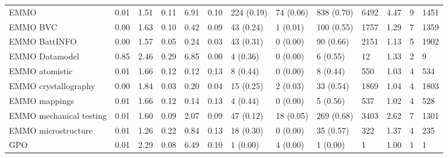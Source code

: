 \begin{table}
\begin{tabular}{m{3.5cm}m{2cm}m{2cm}m{2cm}m{2cm}m{2cm}m{2cm}m{2cm}m{2cm}m{2cm}m{2cm}m{2cm}m{2cm}}
EMMO                    &                0.01 &                  1.51 &                   0.11 &               6.91 &               0.10 &  224 (0.19) &   74 (0.06) &   838 (0.70) &            6492 &     4.47 &          9 &              1451 \\
EMMO BVC                &                0.00 &                  1.63 &                   0.10 &               0.42 &               0.09 &   43 (0.24) &    1 (0.01) &   100 (0.55) &            1757 &     1.29 &          7 &              1359 \\
EMMO BattINFO           &                0.00 &                  1.57 &                   0.05 &               0.24 &               0.03 &   43 (0.31) &    0 (0.00) &    90 (0.66) &            2151 &     1.13 &          5 &              1902 \\
EMMO Datamodel          &                0.85 &                  2.46 &                   0.29 &               6.85 &               0.00 &    4 (0.36) &    0 (0.00) &     6 (0.55) &              12 &     1.33 &          2 &                 9 \\
EMMO atomistic          &                0.01 &                  1.66 &                   0.12 &               0.12 &               0.13 &    8 (0.44) &    0 (0.00) &     8 (0.44) &             550 &     1.03 &          4 &               534 \\
EMMO crystallography    &                0.00 &                  1.84 &                   0.03 &               0.20 &               0.04 &   15 (0.25) &    2 (0.03) &    33 (0.54) &            1869 &     1.04 &          4 &              1803 \\
EMMO mappings           &                0.01 &                  1.66 &                   0.12 &               0.14 &               0.13 &    4 (0.44) &    0 (0.00) &     5 (0.56) &             537 &     1.02 &          4 &               528 \\
EMMO mechanical testing &                0.01 &                  1.60 &                   0.09 &               2.07 &               0.09 &   47 (0.12) &   18 (0.05) &   269 (0.68) &            3403 &     2.62 &          7 &              1301 \\
EMMO microstructure     &                0.01 &                  1.26 &                   0.22 &               0.84 &               0.13 &   18 (0.30) &    0 (0.00) &    35 (0.57) &             322 &     1.37 &          4 &               235 \\
GPO                     &                0.01 &                  2.29 &                   0.08 &               6.49 &               0.10 &    1 (0.00) &    4 (0.00) &     1 (0.00) &               1 &     1.00 &          1 &                 1 \\

\end{tabular}
\end{table}
